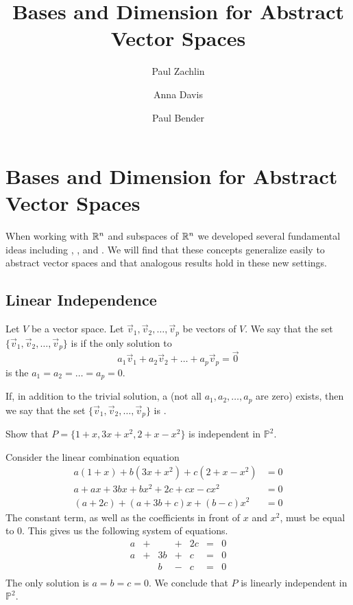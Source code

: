 \documentclass{ximera}
\author{Paul Zachlin \and Anna Davis \and Paul Bender} \title{Bases and Dimension for Abstract Vector Spaces} \license{CC-BY-NC-SA}
\begin{document}
\begin{abstract}
\end{abstract}
\maketitle


\section*{Bases and Dimension for Abstract Vector Spaces}
When working with $\mathbb{R}^n$ and subspaces of $\mathbb{R}^n$ we developed several fundamental ideas including , ,  and .  We will find that these concepts generalize easily to abstract vector spaces and that analogous results hold in these new settings.
\subsection*{Linear Independence}
\begin{definition}\label{def:linearindependenceabstract}
Let $V$ be a vector space.  Let $\vec{v}_1, \vec{v}_2,\ldots ,\vec{v}_p$ be vectors of $V$.  We say that the set $\{\vec{v}_1, \vec{v}_2,\ldots ,\vec{v}_p\}$ is  if the only solution to 
$$a_1\vec{v}_1+a_2\vec{v}_2+\ldots +a_p\vec{v}_p=\vec{0}$$
is the  $a_1=a_2=\ldots =a_p=0$.

If, in addition to the trivial solution, a  (not all $a_1, a_2,\ldots ,a_p$ are zero) exists, then we say that the set $\{\vec{v}_1, \vec{v}_2,\ldots ,\vec{v}_p\}$ is .
\end{definition}

\begin{example}\label{ex:polyindset} 
Show that $P=\{1 + x, 3x + x^{2}, 2 + x - x^{2}\}$ is independent in $\mathbb{P}^{2}$.

\begin{explanation}
Consider the linear combination equation
\begin{align*}
a(1 + x) + b(3x + x^2) + c(2 + x - x^2) &= 0\\
a+ax+3bx+bx^2+2c+cx-cx^2&=0\\
(a+2c)+(a+3b+c)x+(b-c)x^2&=0
\end{align*}
The constant term, as well as the coefficients in front of $x$ and $x^2$, must be equal to $0$.  This gives us the following system of equations.
\begin{equation*}
\begin{array}{rlrlrcr}
	a & + &      & + & 2c & = & 0 \\
	a & + & 3b & + &  c & = & 0 \\
	    &   &  b & - &  c & = & 0 \\
\end{array}
\end{equation*}
The only solution is $a = b = c = 0$.  We conclude that $P$ is linearly independent in $\mathbb{P}^2$.
\end{explanation}
\end{example}
\end{document}
